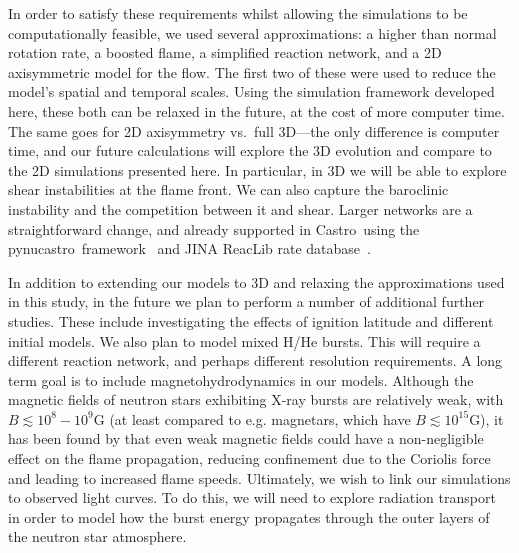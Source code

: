 \documentclass[trackchanges,preprint,times,tighten]{aastex63}
\newcommand{\castro}{{\sf Castro}}
\newcommand{\pynucastro}{{\sf pynucastro}}
\begin{document}
In order to satisfy these requirements whilst allowing the simulations
to be computationally feasible, we used several approximations: a
higher than normal rotation rate, a boosted flame, a simplified
reaction network, and a 2D axisymmetric model for the flow. The first two of
these were used to reduce the model's spatial and temporal
scales. Using the simulation framework developed here, these both can
be relaxed in the future, at the cost of more computer time. The same
goes for 2D axisymmetry vs.\ full 3D---the only difference is computer time, and
our future calculations will explore the 3D evolution and compare to
the 2D simulations presented here. In particular, in 3D we will be
able to explore shear instabilities at the flame front.  We can also
capture the baroclinic instability \citep{Cavecchi2019} and the
competition between it and shear.  Larger networks are a
straightforward change, and already supported in \castro\ using the
\pynucastro\ framework~\citep{pynucastro} and JINA ReacLib rate
database~\citep{reaclib}.


In addition to extending our models to 3D and relaxing the
approximations used in this study, in the future we plan to perform a
number of additional further studies.  These include investigating the
effects of ignition latitude and different initial models. We also
plan to model mixed H/He bursts. This will require a different
reaction network, and perhaps different resolution
requirements. A long term goal is to include magnetohydrodynamics in
our models. Although the magnetic fields of neutron stars exhibiting
X-ray bursts are relatively weak, with $B \lesssim 10^8 - 10^9$G
\citep{mukherjee2015magnetic} (at least compared to e.g. magnetars,
which have $B\lesssim 10^{15}$G), it has been found by
\citet{art-2016-cavecchi-etal} that even weak magnetic fields could
have a non-negligible effect on the flame propagation, reducing
confinement due to the Coriolis force and leading to increased flame
speeds. Ultimately, we wish to link our simulations to observed light
curves. To do this, we will need to explore radiation transport in
order to model how the burst energy propagates through the outer
layers of the neutron star atmosphere.




\end{document}
